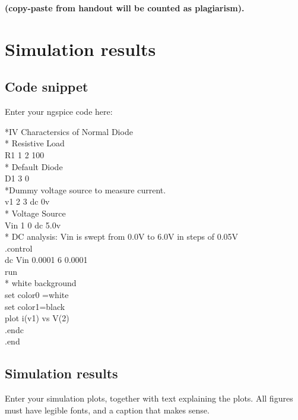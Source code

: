 \documentclass[12pt]{article}
\begin{document}


\textbf{(copy-paste from handout will be counted as plagiarism).} 



\section{Simulation results}%
\subsection{Code snippet}

Enter your ngspice code here:

*IV Charactersics of Normal Diode\\
* Resistive Load\\
R1 1 2 100\\
* Default Diode\\
D1 3 0 \\
*Dummy voltage source to measure current.\\
v1 2 3 dc 0v\\
* Voltage Source\\
Vin 1 0 dc 5.0v\\
* DC analysis: Vin is swept from 0.0V to 6.0V in steps of 0.05V\\
.control \\
dc Vin 0.0001 6 0.0001\\
run\\
* white background\\
set color0 =white\\
set color1=black\\
plot i(v1) vs V(2) \\
.endc\\
.end\\




\subsection{Simulation results}

Enter your simulation plots, together with text explaining the plots. All figures must have legible fonts, and a caption that makes sense.
\end{document}
